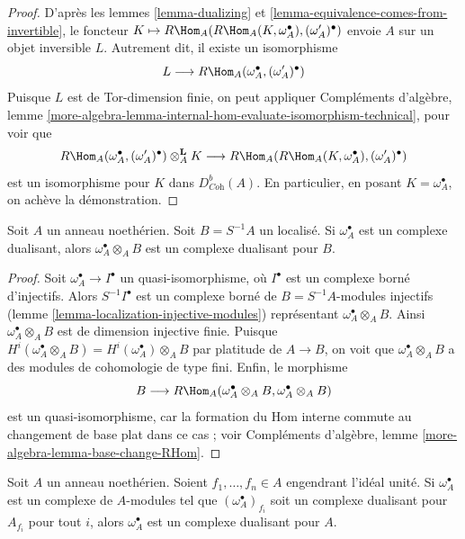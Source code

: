 \begin{proof}
D'après les lemmes \ref{lemma-dualizing} et \ref{lemma-equivalence-comes-from-invertible}, le foncteur $K \mapsto R\Hom_A(R\Hom_A(K, \omega_A^\bullet), (\omega_A')^\bullet)$
envoie $A$ sur un objet inversible $L$.
Autrement dit, il existe un isomorphisme
$$
L \longrightarrow R\Hom_A(\omega_A^\bullet, (\omega_A')^\bullet)
$$
Puisque $L$ est de Tor-dimension finie, on peut appliquer
Compléments d'algèbre, lemme \ref{more-algebra-lemma-internal-hom-evaluate-isomorphism-technical}, pour voir que
$$
R\Hom_A(\omega_A^\bullet, (\omega'_A)^\bullet) \otimes_A^\mathbf{L} K
\longrightarrow
R\Hom_A(R\Hom_A(K, \omega_A^\bullet), (\omega_A')^\bullet)
$$
est un isomorphisme pour $K$ dans $D^b_{\textit{Coh}}(A)$.
En particulier, en posant $K = \omega_A^\bullet$, on achève la démonstration.
\end{proof}

\begin{lemma}
\label{lemma-dualizing-localize}
Soit $A$ un anneau noethérien. Soit $B = S^{-1}A$ un localisé.
Si $\omega_A^\bullet$ est un complexe dualisant, alors $\omega_A^\bullet \otimes_A B$
est un complexe dualisant pour $B$.
\end{lemma}

\begin{proof}
Soit $\omega_A^\bullet \to I^\bullet$ un quasi-isomorphisme, où $I^\bullet$ est un complexe borné d'injectifs.
Alors $S^{-1}I^\bullet$ est un complexe borné de $B = S^{-1}A$-modules injectifs
(lemme \ref{lemma-localization-injective-modules}) représentant $\omega_A^\bullet \otimes_A B$.
Ainsi $\omega_A^\bullet \otimes_A B$ est de dimension injective finie.
Puisque $H^i(\omega_A^\bullet \otimes_A B) = H^i(\omega_A^\bullet) \otimes_A B$ par platitude de $A \to B$,
on voit que $\omega_A^\bullet \otimes_A B$ a des modules de cohomologie de type fini.
Enfin, le morphisme
$$
B \longrightarrow
R\Hom_A(\omega_A^\bullet \otimes_A B, \omega_A^\bullet \otimes_A B)
$$
est un quasi-isomorphisme, car la formation du Hom interne commute
au changement de base plat dans ce cas ; voir
Compléments d'algèbre, lemme \ref{more-algebra-lemma-base-change-RHom}.
\end{proof}

\begin{lemma}
\label{lemma-dualizing-glue}
Soit $A$ un anneau noethérien. Soient $f_1, \ldots, f_n \in A$ engendrant l'idéal unité.
Si $\omega_A^\bullet$ est un complexe de $A$-modules tel que $(\omega_A^\bullet)_{f_i}$
soit un complexe dualisant pour $A_{f_i}$ pour tout $i$,
alors $\omega_A^\bullet$ est un complexe dualisant pour $A$.
\end{lemma}

